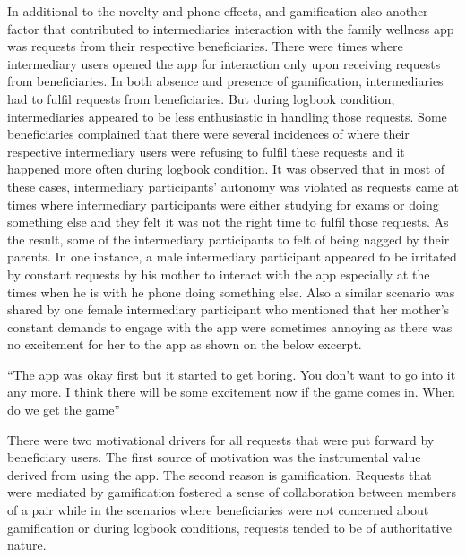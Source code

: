 In additional to the novelty and phone effects, and gamification also another factor that contributed to intermediaries interaction with the family wellness app was requests from their respective beneficiaries.
There were times where intermediary users opened the app for interaction only upon receiving requests from beneficiaries. In both absence and presence of gamification, intermediaries had to fulfil requests from beneficiaries.  But during logbook condition, intermediaries appeared to be less enthusiastic in handling those requests. Some beneficiaries complained that there were several incidences of where their respective intermediary users were refusing to fulfil these requests and it happened more often during logbook condition. It was observed that in most of these cases, intermediary participants' autonomy was violated as requests came at times where intermediary participants were either studying for exams or doing something else and they felt it was not the right time to fulfil those requests. As the result, some of the intermediary participants to felt of being nagged by their parents. In one instance, a male intermediary participant appeared to be irritated by constant requests by his mother to interact with the app especially at the times when he is with he phone doing something else. Also a similar scenario was shared by one female intermediary participant who mentioned that her mother's constant demands to engage with the app were sometimes annoying as there was no excitement for her to the app as shown on the below excerpt.

 {``The app was okay first but it started to get boring. You don't want to go into it any more. I think there will be some excitement now if the game comes in. When do we get the game''}

There were two motivational drivers for all requests that were put forward by beneficiary users. The first source of motivation was the instrumental value derived from using the app. The second reason is gamification. Requests that were mediated by gamification fostered a sense of collaboration between members of a pair while in the scenarios where beneficiaries were not concerned about gamification or during logbook conditions, requests tended to be of authoritative nature.


